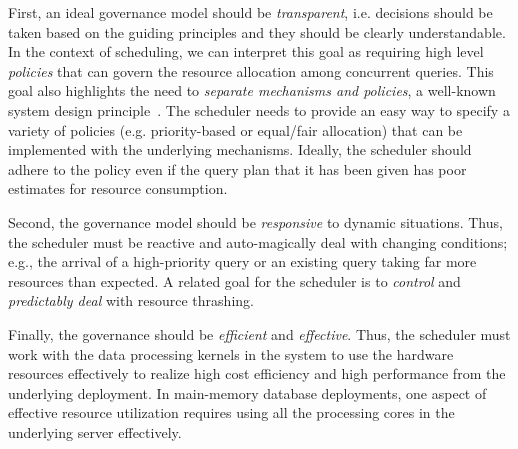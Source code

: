 First, an ideal governance model should be \textit{transparent}, i.e. decisions should be taken based on the guiding principles and they should be clearly understandable.
In the context of scheduling, we can interpret this goal as requiring high level \textit{policies} that can govern the resource allocation among concurrent queries. 
This goal also highlights the need to \textit{separate mechanisms and policies}, a well-known system design principle~\cite{LampsonS76}.
The scheduler needs to provide an easy way to specify a variety of policies (e.g. priority-based or equal/fair allocation) that can be implemented with the underlying mechanisms.
Ideally, the scheduler should adhere to the policy even if the query plan that it has been given has poor estimates for resource consumption.

Second, the governance model should be \textit{responsive} to dynamic situations. 
Thus, the scheduler must be reactive and auto-magically deal with changing conditions; e.g., the arrival of a high-priority query or an existing query taking far more resources than expected. 
A related goal for the scheduler is to \textit{control} and \textit{predictably deal} with resource thrashing.

Finally, the governance should be \textit{efficient} and \textit{effective}. 
Thus, the scheduler must work with the data processing kernels in the system to use the hardware resources effectively to realize high cost efficiency and high performance from the underlying deployment. 
In main-memory database deployments, one aspect of effective resource utilization requires using all the processing cores in the underlying server effectively. 

